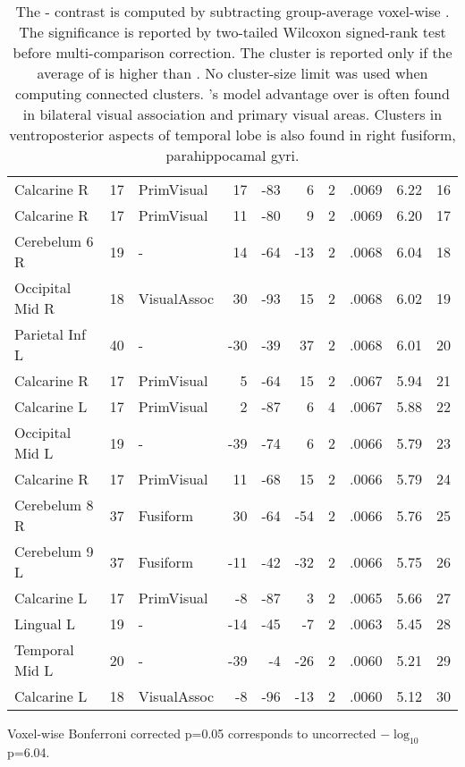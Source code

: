 \begin{table}
\begin{ThreePartTable}
\begin{tabularx}{\textwidth}{l l p{1.5cm} *{3}{r} *{2}{P{.8cm}} P{1.3cm} P{.5cm}}
Calcarine R & 17 & PrimVisual & 17 & -83 & 6 & 2 &  .0069  & 6.22 & 16 \\
Calcarine R & 17 & PrimVisual & 11 & -80 & 9 & 2 &  .0069  & 6.20 & 17 \\
Cerebelum 6 R & 19 & - & 14 & -64 & -13 & 2 &  .0068 & 6.04  & 18 \\
Occipital Mid R & 18 & VisualAssoc & 30 & -93 & 15 & 2 &  .0068 & 6.02  & 19 \\
Parietal Inf L & 40 & - & -30 & -39 & 37 & 2 &  .0068 & 6.01 & 20 \\
Calcarine R & 17 & PrimVisual & 5 & -64 & 15 & 2 &  .0067& 5.94  & 21 \\
Calcarine L & 17 & PrimVisual & 2 & -87 & 6 & 4 &  .0067 & 5.88 & 22 \\
Occipital Mid L & 19 & - & -39 & -74 & 6 & 2 &  .0066 & 5.79 & 23 \\
Calcarine R & 17 & PrimVisual & 11 & -68 & 15 & 2 &  .0066 & 5.79 & 24 \\
Cerebelum 8 R & 37 & Fusiform & 30 & -64 & -54 & 2 &  .0066 & 5.76 & 25 \\
Cerebelum 9 L & 37 & Fusiform & -11 & -42 & -32 & 2 &  .0066 & 5.75& 26 \\
Calcarine L & 17 & PrimVisual & -8 & -87 & 3 & 2 &  .0065 & 5.66 & 27 \\
Lingual L & 19 & - & -14 & -45 & -7 & 2 &  .0063 & 5.45 & 28 \\
Temporal Mid L & 20 & - & -39 & -4 & -26 & 2 &  .0060 & 5.21 & 29 \\
Calcarine L & 18 & VisualAssoc & -8 & -96 & -13 & 2 &  .0060 & 5.12 & 30 \\
\bottomrule
    \end{tabularx}
    \begin{tablenotes}
        \footnotesize
        \item[] Voxel-wise Bonferroni corrected p=0.05 corresponds to uncorrected \(-\log_{10}\) p=6.04.
    \end{tablenotes}  
\end{ThreePartTable}
\caption[ Voxel Contrast, , Group]{The - contrast is computed by subtracting group-average voxel-wise . The significance is reported by two-tailed Wilcoxon signed-rank test before multi-comparison correction. The cluster is reported only if the average  of  is higher than . No cluster-size limit was used when computing connected clusters. 's model advantage over  is often found in bilateral visual association and primary visual areas. Clusters in ventroposterior aspects of temporal lobe is also found in right fusiform, parahippocamal gyri. \label{tab:simasnContrastClusters_asn}}
\end{table}


